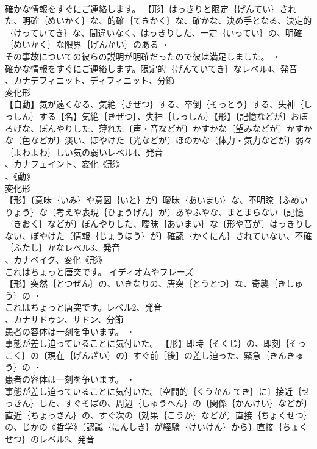 \documentclass[8pt]{extreport}
\begin{document}
\begin{CJK}{UTF8}{min}
\\	確かな情報をすぐにご連絡します。		【形】はっきりと限定｛げんてい｝された、明確｛めいかく｝な、的確｛てきかく｝な、確かな、決め手となる、決定的｛けっていてき｝な、間違いなく、はっきりした、一定｛いってい｝の、明確｛めいかく｝な限界｛げんかい｝のある ・
\\	その事故についての彼らの説明が明確だったので彼は満足しました。 ・
\\	確かな情報をすぐにご連絡します。限定的｛げんていてき｝なレベル4、発音
\\	、カナデフィニット、ディフィニット、分節
\\	変化形 
\\	【自動】気が遠くなる、気絶｛きぜつ｝する、卒倒｛そっとう｝する、失神｛しっしん｝する【名】気絶｛きぜつ｝、失神｛しっしん｝【形】〔記憶などが〕おぼろげな、ぼんやりした、薄れた〔声・音などが〕かすかな〔望みなどが〕かすかな〔色などが〕淡い、ぼやけた〔光などが〕ほのかな〔体力・気力などが〕弱々｛よわよわ｝しい気の弱いレベル4、発音
\\	、カナフェイント、変化《形》
\\	、《動》
\\	変化形 
\\	【形】〔意味｛いみ｝や意図｛いと｝が〕曖昧｛あいまい｝な、不明瞭｛ふめいりょう｝な〔考えや表現｛ひょうげん｝が〕あやふやな、まとまらない〔記憶｛きおく｝などが〕ぼんやりした、曖昧｛あいまい｝な〔形や音が〕はっきりしない、ぼやけた〔情報｛じょうほう｝が〕確認｛かくにん｝されていない、不確｛ふたし｝かなレベル3、発音
\\	、カナベイグ、変化《形》
\\	これはちょっと唐突です。	イディオムやフレーズ 
\\	【形】突然｛とつぜん｝の、いきなりの、唐突｛とうとつ｝な、奇襲｛きしゅう｝の ・
\\	これはちょっと唐突です。レベル2、発音
\\	、カナサドゥン、サドン、分節
\\	患者の容体は一刻を争います。 ・
\\	事態が差し迫っていることに気付いた。		【形】即時｛そくじ｝の、即刻｛そっこく｝の〔現在｛げんざい｝の〕すぐ前［後］の差し迫った、緊急｛きんきゅう｝の ・
\\	患者の容体は一刻を争います。 ・
\\	事態が差し迫っていることに気付いた。〔空間的｛くうかん てき｝に〕接近｛せっきん｝した、すぐそばの、周辺｛しゅうへん｝の〔関係｛かんけい｝などが〕直近｛ちょっきん｝の、すぐ次の〔効果｛こうか｝などが〕直接｛ちょくせつ｝の、じかの《哲学》〔認識｛にんしき｝が経験｛けいけん｝から〕直接｛ちょくせつ｝のレベル2、発音

\end{CJK}
\end{document}
